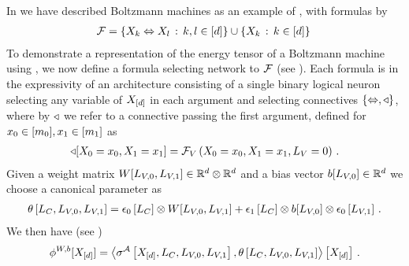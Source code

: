 \begin{example}
    \label{exa:boltzmannEnergySelection}
    In  we have described Boltzmann machines as an example of \MarkovLogicNetworks{}, with formulas by
    \begin{align*}
        \mathcal{F} = \{ X_{k} \Leftrightarrow X_{l} \,:\, k,l \in[d] \}
        \cup \{ X_{k}\,:\, k\in[d] \} \,
    \end{align*}
    To demonstrate a representation of the energy tensor of a Boltzmann machine using \SelectionSparsity{}, we now define a formula selecting network to $\mathcal{F}$ (see ).
    Each formula is in the expressivity of an architecture consisting of a single binary logical neuron selecting any variable of $X_{[d]}$ in each argument and selecting connectives $\{\Leftrightarrow,\triangleleft\}$, where by $\triangleleft$ we refer to a connective passing the first argument, defined for $x_{0}\in[m_{0}], x_{1}\in[m_{1}]$ as
    \begin{align*}
        \triangleleft[X_{0}=x_{0},X_{1}=x_{1}] = \mathcal{F}_{V}\left(X_{0}=x_{0},X_{1}=x_{1},L_{V}=0\right) \, .
    \end{align*}
    Given a weight matrix $W[L_{V,0},L_{V,1}] \in\mathbb{R}^{d}\otimes\mathbb{R}^{d}$ and a bias vector $b[L_{V,0}] \in\mathbb{R}^{d}$ we choose a canonical parameter as
    \begin{align*}
        \theta\left[L_{C},L_{V,0},L_{V,1}\right]
    = \epsilon_{0}\left[L_{C}\right] \otimes W[L_{V,0},L_{V,1}]
    + \epsilon_{1}\left[L_{C}\right] \otimes b[L_{V,0}] \otimes  \epsilon_{0}\left[L_{V,1}\right] \, .
    \end{align*}
    We then have (see )
    \begin{align*}
        \phi^{W,b}[X_{[d]}] =
    \left\langle \sigma^{\mathcal{A}}\left[X_{[d]},L_{C},L_{V,0},L_{V,1}\right],
        \theta\left[L_{C},L_{V,0},L_{V,1}\right]\right\rangle \left[ X_{[d]} \right] \, .
    \end{align*}
\end{example}

